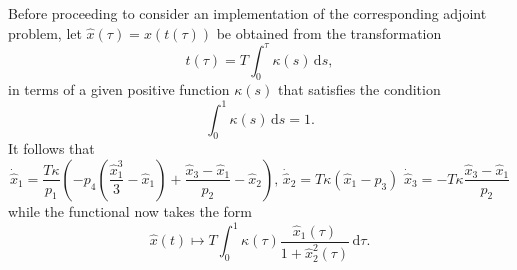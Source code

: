 Before proceeding to consider an implementation of the corresponding adjoint  problem, let $\hat{x}(\tau)=x(t(\tau))$ be obtained from the transformation
\begin{equation}
t(\tau) = T\int_0^\tau\kappa(s)\,\mathrm{d}s,
\end{equation}
in terms of a given positive function $\kappa(s)$ that satisfies the condition
\begin{equation}
\int_0^1\kappa(s)\,\mathrm{d}s=1.
\end{equation}
It follows that 
\begin{equation}
\dot{\hat{x}}_1=\frac{T\kappa}{p_1}\left(-p_4\left(\frac{\hat{x}_1^3}{3}-\hat{x}_1\right)+\frac{\hat{x}_3-\hat{x}_1}{p_2}-\hat{x}_2\right),\,\dot{\hat{x}}_2=T\kappa\left(\hat{x}_1-p_3\right)\,\,\dot{\hat{x}}_3=-T\kappa\frac{\hat{x}_3-\hat{x}_1}{p_2}
\end{equation}
while the functional now takes the form
\begin{equation}
\hat{x}(t)\mapsto T\int_0^1\kappa(\tau)\frac{\hat{x}_1(\tau)}{1+\hat{x}_2^2(\tau)}\,\mathrm{d}\tau.
\end{equation}

